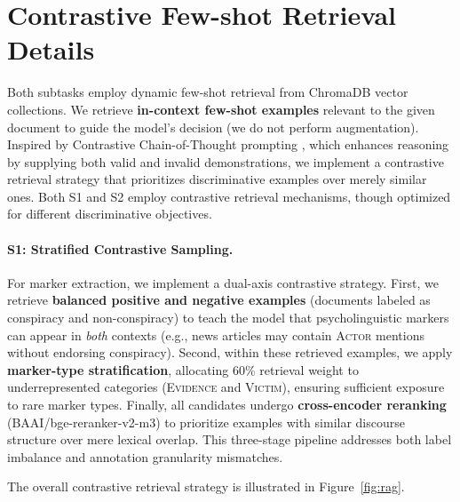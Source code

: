 \documentclass[11pt]{article}
\begin{document}
\section{Contrastive Few-shot Retrieval Details}
\label{app:rag-details}
Both subtasks employ dynamic few-shot retrieval from ChromaDB \cite{chromadb2023} vector collections.
We retrieve \textbf{in-context few-shot examples} relevant to the given document to guide the model's decision (we do not perform augmentation). Inspired by Contrastive Chain-of-Thought prompting \cite{chia2023contrastive}, which enhances reasoning by supplying both valid and invalid demonstrations, we implement a contrastive retrieval strategy that prioritizes discriminative examples over merely similar ones. Both S1 and S2 employ contrastive retrieval mechanisms, though optimized for different discriminative objectives.



\paragraph{S1: Stratified Contrastive Sampling.}
For marker extraction, we implement a dual-axis contrastive strategy. First, we
retrieve \textbf{balanced positive and negative examples} (documents labeled as
conspiracy and non-conspiracy) to teach the model that psycholinguistic markers
can appear in \textit{both} contexts (e.g., news articles may contain
\textsc{Actor} mentions without endorsing conspiracy). Second, within these
retrieved examples, we apply \textbf{marker-type stratification}, allocating
60\% retrieval weight to underrepresented categories (\textsc{Evidence} and
\textsc{Victim}), ensuring sufficient exposure to rare marker types. Finally,
all candidates undergo \textbf{cross-encoder reranking}
(BAAI/bge-reranker-v2-m3) \cite{bge_m3} to prioritize examples with similar
discourse structure over mere lexical overlap. This three-stage pipeline
addresses both label imbalance and annotation granularity mismatches.

The overall contrastive retrieval strategy is illustrated in
Figure~\ref{fig:rag}.
\end{document}
